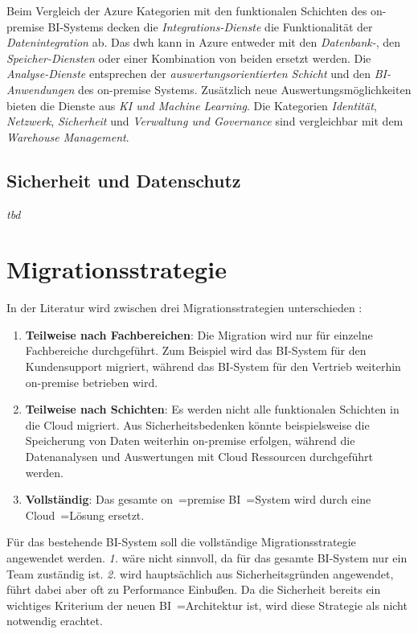 Beim Vergleich der Azure Kategorien mit den funktionalen Schichten des on-premise BI-Systems decken die \textit{Integrations-Dienste} die  Funktionalität der \textit{Datenintegration} ab. Das \ac{dwh} kann in Azure entweder mit den \textit{Datenbank-}, den \textit{Speicher-Diensten} oder einer Kombination von beiden ersetzt werden. Die \textit{Analyse-Dienste} entsprechen der \textit{auswertungsorientierten Schicht} und den \textit{BI-Anwendungen} des on-premise Systems. Zusätzlich neue Auswertungsmöglichkeiten bieten die Dienste aus \textit{KI und Machine Learning}. Die Kategorien \textit{Identität}, \textit{Netzwerk}, \textit{Sicherheit} und \textit{Verwaltung und Governance} sind vergleichbar mit dem \textit{Warehouse Management}.

\subsection{Sicherheit und Datenschutz} \label{subsec:grundlagen:azure:sicherheitUndDatenschutz}
\textit{tbd}

\section{Migrationsstrategie} \label{sec:beschreibungMigrationsstrategie}
In der Literatur wird zwischen drei Migrationsstrategien unterschieden \cite{juan-verdejo_moving_2014}:
\begin{enumerate}
\item \textbf{Teilweise nach Fachbereichen}: Die Migration wird nur für einzelne Fachbereiche durchgeführt. Zum Beispiel wird das BI-System für den Kundensupport migriert, während das BI-System für den Vertrieb weiterhin on-premise betrieben wird.
\item \textbf{Teilweise nach Schichten}: Es werden nicht alle funktionalen Schichten in die Cloud migriert. Aus Sicherheitsbedenken könnte beispielsweise die Speicherung von Daten weiterhin on-premise erfolgen, während die Datenanalysen und Auswertungen mit Cloud Ressourcen durchgeführt werden.
\item \textbf{Vollständig}: Das gesamte on~=premise BI~=System wird durch eine Cloud~=Lösung ersetzt.
\end{enumerate}
Für das bestehende BI-System soll die vollständige Migrationsstrategie angewendet werden. \textit{1.} wäre nicht sinnvoll, da für das gesamte BI-System nur ein Team zuständig ist. \textit{2.} wird hauptsächlich aus Sicherheitsgründen angewendet, führt dabei aber oft zu Performance Einbußen. Da die Sicherheit bereits ein wichtiges Kriterium der neuen BI~=Architektur ist, wird diese Strategie als nicht notwendig erachtet.

